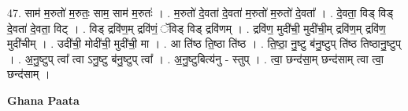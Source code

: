 \documentclass[17pt]{extarticle}
\begin{document}
47. साम॑ म॒रुतो॑ म॒रुतः॒ साम॒ साम॑ म॒रुतः॑ । . म॒रुतो॑ दे॒वता॑ दे॒वता॑ म॒रुतो॑ म॒रुतो॑ दे॒वता᳚ । . दे॒वता॒ विड् विड् दे॒वता॑ दे॒वता॒ विट् । . विड् द्रवि॑ण॒म् द्रवि॑णं॒ ॅविड् विड् द्रवि॑णम् । . द्रवि॑ण॒ मुदी॑ची॒ मुदी॑ची॒म् द्रवि॑ण॒म् द्रवि॑ण॒ मुदी॑चीम् । . उदी॑ची॒ मोदी॑ची॒ मुदी॑ची॒ मा । . आ ति॑ष्ठ ति॒ष्ठा ति॑ष्ठ । . ति॒ष्ठा॒ नु॒ष्टु ब॑नु॒ष्टुप् ति॑ष्ठ तिष्ठानु॒ष्टुप् । . अ॒नु॒ष्टुप् त्वा᳚ त्वा ऽनु॒ष्टु ब॑नु॒ष्टुप् त्वा᳚ । . अ॒नु॒ष्टुबित्य॑नु - स्तुप् । . त्वा॒ छन्द॑सा॒म् छन्द॑साम् त्वा त्वा॒ छन्द॑साम् । \newline

\textbf{Ghana Paata } \newline
\end{document}
